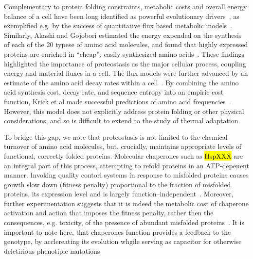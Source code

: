\documentclass[10pt,letterpaper]{article}
\begin{document}
Complementary to protein folding constraints, metabolic costs and overall energy balance of a cell have been long identified as powerful evolutionary drivers~\cite{Pal2006An}, as exemplified e.g. by the success of quantitative flux based metabolic models~\cite{Varma1994Metabolic,Price2004Genome}. Similarly, Akashi and Gojobori estimated the energy expended on the synthesis of each of the 20 typese of amino acid molecules, and found that highly expressed proteins are enriched in ``cheap'', easily synthesized amino acids~\cite{Akashi2002Metabolic}. These findings highlighted the importance of proteostasis as the major cellular process, coupling energy and material fluxes in a cell. The flux models were further advanced by an estimate of the amino acid decay rates within a cell~\cite{Krick2014Amino}. By combining the amino acid synthesis cost, decay rate, and sequence entropy into an empiric cost function, Krick et al made successful predictions of amino acid frequencies~\cite{Krick2014Amino}. However, this model does not explicitly address protein folding or other physical considerations, and so is difficult to extend to the study of thermal adaptation.

To bridge this gap, we note that proteostasis is not limited to the chemical turnover of amino acid molecules, but, crucially, maintains appropriate levels of functional, correctly folded proteins. Molecular chaperones such as \hl{HspXXX} are an integral part of this process, attempting to refold proteins in an ATP-depenent manner. Invoking quality contorl systems in response to misfolded proteins causes growth slow down (fitness penalty) proportional to the fraction of misfolded proteins, its expression level and is largely function--independent~\cite{Samerotte2011Misfolded}. Moreover, further experimentation suggests that it is indeed the metabolic cost of chaperone activation and action that imposes the fitness penalty, rather then the consequences, e.g. toxicity, of the presence of abundant misfolded proteins~\cite{Tomala2014Fitness}. It is important to note here, that chaperones function provides a feedback to the genotype, by acclereating its evolution whgile serving as capacitor for otherwise deletirious phenotipic mutations~\cite{Bogumil2012Cumulative,Cetinbas2013Catalysis}
\end{document}

